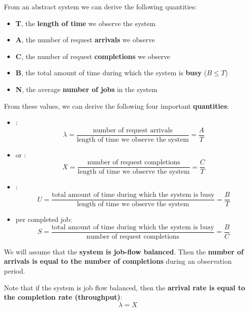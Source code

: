 From an abstract system we can derive the following quantities:
\begin{itemize}
	\item \textbf{T}, the \textbf{length of time} we observe the system
	\item \textbf{A}, the number of request \textbf{arrivals} we observe
	\item \textbf{C}, the number of request \textbf{completions} we observe
	\item \textbf{B}, the total amount of time during which the system is \textbf{busy} ($B \le T$)
	\item \textbf{N}, the average \textbf{number of jobs} in the system
\end{itemize}
From these values, we can derive the following four important \textbf{quantities}:
\begin{itemize}
	\item {}:
	\begin{equation}
		\lambda = \dfrac{\text{number of request arrivals}}{\text{length of time we observe the system}} = \dfrac{A}{T}
	\end{equation}
	
	\item {} or :
	\begin{equation}
		X = \dfrac{\text{number of request completions}}{\text{length of time we observe the system}} = \dfrac{C}{T}
	\end{equation}
	
	\item {}:
	\begin{equation}
		U = \dfrac{\text{total amount of time during which the system is busy}}{\text{length of time we observe the system}} = \dfrac{B}{T}
	\end{equation}
	
	\item {} per completed job:
	\begin{equation}
		S = \dfrac{\text{total amount of time during which the system is busy}}{\text{number of request completions}} = \dfrac{B}{C}
	\end{equation}
\end{itemize}
We will assume that the \textbf{system is job-flow balanced}. Then the \textbf{number of arrivals is equal to the number of completions} during an observation period.

\highspace
Note that if the system is job flow balanced, then the \textbf{arrival rate is equal to the completion rate (throughput)}:
\begin{equation*}
	\lambda = X
\end{equation*}

